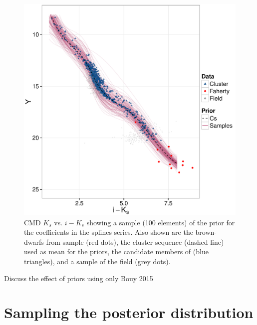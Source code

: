 \begin{figure}[ht!]
\begin{center}
\includegraphics[page=4,width=\textwidth]{background/Figures/Priors_Coefs.pdf}
\caption{CMD $K_s$ vs. $i-K_s$ showing a sample (100 elements) of the prior for the coefficients in the splines series. Also shown are the brown-dwarfs from \citet{Faherty2012} sample (red dots), the cluster sequence (dashed line) used as mean for the priors, the candidate members of \citet{Bouy2015} (blue triangles), and a sample of the field (grey dots).}
\label{figure:priorcoefs}
\end{center}
\end{figure}

{\color{red}Discuss the effect of priors using only Bouy 2015}

\section{Sampling the posterior distribution}

